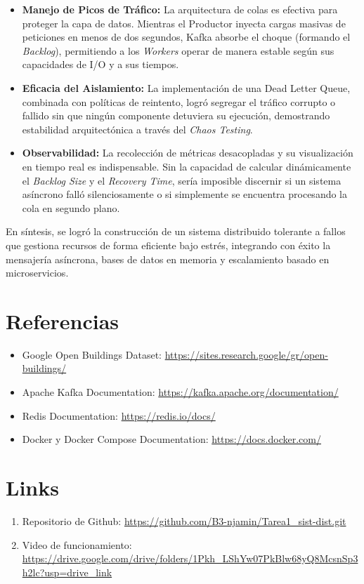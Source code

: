 \documentclass[letter,12pt]{article}
\begin{document}
\begin{itemize}
    \item \textbf{Manejo de Picos de Tráfico:} La arquitectura de colas es efectiva para proteger la capa de datos. Mientras el Productor inyecta cargas masivas de peticiones en menos de dos segundos, Kafka absorbe el choque (formando el \textit{Backlog}), permitiendo a los \textit{Workers} operar de manera estable según sus capacidades de I/O y a sus tiempos.
    
    \item \textbf{Eficacia del Aislamiento:} La implementación de una Dead Letter Queue, combinada con políticas de reintento, logró segregar el tráfico corrupto o fallido sin que ningún componente detuviera su ejecución, demostrando estabilidad arquitectónica a través del \textit{Chaos Testing}.

    \item \textbf{Observabilidad:} La recolección de métricas desacopladas y su visualización en tiempo real es indispensable. Sin la capacidad de calcular dinámicamente el \textit{Backlog Size} y el \textit{Recovery Time}, sería imposible discernir si un sistema asíncrono falló silenciosamente o si simplemente se encuentra procesando la cola en segundo plano.
\end{itemize}

En síntesis, se logró la construcción de un sistema distribuido tolerante a fallos que gestiona recursos de forma eficiente bajo estrés, integrando con éxito la mensajería asíncrona, bases de datos en memoria y escalamiento basado en microservicios.

\section{Referencias}

\begin{itemize}
    \item Google Open Buildings Dataset: \url{https://sites.research.google/gr/open-buildings/}
    \item Apache Kafka Documentation: \url{https://kafka.apache.org/documentation/}
    \item Redis Documentation: \url{https://redis.io/docs/}
    \item Docker y Docker Compose Documentation: \url{https://docs.docker.com/}
\end{itemize}

\section*{Links}
\begin{enumerate}
    \item Repositorio de Github: \url{https://github.com/B3-njamin/Tarea1_sist-dist.git}
    \item Video de funcionamiento: \url{https://drive.google.com/drive/folders/1Pkh_LShYw07PkBlw68yQ8McsnSp3h2lc?usp=drive_link}
\end{enumerate}
\end{document}
